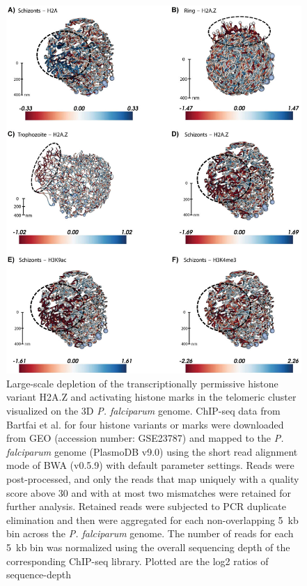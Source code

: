 \begin{figure}
\includegraphics[width=\linewidth]{figures/fig2.png}
\caption{
Large-scale depletion of the transcriptionally permissive histone variant
H2A.Z and activating histone marks in the telomeric cluster
visualized on the 3D \textit{P. falciparum} genome. ChIP-seq data from Bartfai et al.
\citet{bartfai:h2az} for four histone variants or marks were downloaded from
GEO (accession number: GSE23787) and mapped to the \textit{P. falciparum} genome
(PlasmoDB v9.0) using the short read alignment mode of
BWA (v0.5.9) \citep{li:fast} with default parameter settings.
Reads were post-processed,
and only the reads that map uniquely with a quality score
above 30 and with at most two mismatches were retained for further analysis.
Retained reads were subjected to PCR duplicate elimination
and then were aggregated for each non-overlapping 5~kb bin across the \textit{P.
falciparum} genome. The number of reads for each 5~kb bin was
normalized using the overall sequencing depth of the corresponding ChIP-seq
library. Plotted are the log2 ratios of sequence-depth
}
\end{figure}
